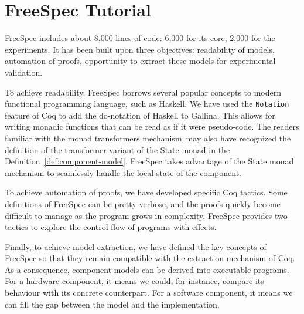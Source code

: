 \chapter{FreeSpec Tutorial}

FreeSpec includes about 8,000 lines of code: 6,000 for its core, 2,000 for the
experiments.
%
It has been built upon three objectives: readability of models, automation of
proofs, opportunity to extract these models for experimental validation.

To achieve readability, FreeSpec borrows several popular concepts to modern
functional programming language, such as Haskell.
%
We have used the \texttt{Notation} feature of Coq to add the do-notation of
Haskell to {\sc Gallina}.
%
This allows for writing monadic functions that can be read as if it were
pseudo-code.
%
The readers familiar with the monad transformers mechanism\,\cite{liang1995mtl}
may also have recognized the definition of the transformer variant of the State
monad in the Definition~\ref{def:component-model}.
%
FreeSpec takes advantage of the State monad mechanism to seamlessly handle the
local state of the component.
%

To achieve automation of proofs, we have developed specific Coq tactics.
%
Some definitions of FreeSpec can be pretty verbose, and the proofs quickly
become difficult to manage as the program grows in complexity.
%
FreeSpec provides two tactics to explore the control flow of programs with
effects.

Finally, to achieve model extraction, we have defined the key concepts of
FreeSpec so that they remain compatible with the extraction mechanism of Coq.
%
As a consequence, component models can be derived into executable programs.
%
For a hardware component, it means we could, for instance, compare its behaviour
with its concrete counterpart.
%
For a software component, it means we can fill the gap between the model and the
implementation.